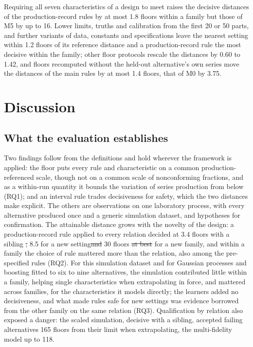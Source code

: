\documentclass[pdflatex,sn-basic,lineno]{sn-jnl}
\providecommand{\DIFadd}[1]{{\protect\color{blue}\uwave{#1}}} %
\providecommand{\DIFdel}[1]{{\protect\color{red}\sout{#1}}}                      %
\providecommand{\DIFaddbegin}{} %
\providecommand{\DIFaddend}{} %
\providecommand{\DIFdelbegin}{} %
\providecommand{\DIFdelend}{} %
\newcommand{\DIFscaledelfig}{0.5}
\newlength{\DIFdelgraphicswidth} %
\newlength{\DIFdelgraphicsheight} %
\newcommand{\DIFaddincludegraphics}[2][]{{\color{blue}\fbox{\DIFOincludegraphics[#1]{#2}}}} %
\newcommand{\DIFdelincludegraphics}[2][]{%
\sbox{\DIFdelgraphicsbox}{\DIFOincludegraphics[#1]{#2}}%
\settoboxwidth{\DIFdelgraphicswidth}{\DIFdelgraphicsbox} %
\settoboxtotalheight{\DIFdelgraphicsheight}{\DIFdelgraphicsbox} %
\scalebox{\DIFscaledelfig}{%
\parbox[b]{\DIFdelgraphicswidth}{\usebox{\DIFdelgraphicsbox}\\[-\baselineskip] \rule{\DIFdelgraphicswidth}{0em}}\llap{\resizebox{\DIFdelgraphicswidth}{\DIFdelgraphicsheight}{%
\setlength{\unitlength}{\DIFdelgraphicswidth}%
\begin{picture}(1,1)%
\thicklines\linethickness{2pt} %
{\color[rgb]{1,0,0}\put(0,0){\framebox(1,1){}}}%
{\color[rgb]{1,0,0}\put(0,0){\line( 1,1){1}}}%
{\color[rgb]{1,0,0}\put(0,1){\line(1,-1){1}}}%
\end{picture}%
}\hspace*{3pt}}} %
} %
\DeclareRobustCommand{\DIFaddbegin}{\DIFOaddbegin \let\includegraphics\DIFaddincludegraphics} %
\DeclareRobustCommand{\DIFaddend}{\DIFOaddend \let\includegraphics\DIFOincludegraphics} %
\DeclareRobustCommand{\DIFdelbegin}{\DIFOdelbegin \let\includegraphics\DIFdelincludegraphics} %
\DeclareRobustCommand{\DIFdelend}{\DIFOaddend \let\includegraphics\DIFOincludegraphics} %
\begin{document}
Requiring all seven characteristics of a design to meet raises the decisive distances of the production-record rules by at most 1.8 floors within a family but those of M5 by up to 16. Lower limits, truths and calibration from the first 20 or 50 parts, and further variants of data, constants and specifications leave the nearest setting within 1.2 floors of its reference distance and a production-record rule the most decisive within the family; other floor protocols rescale the distances by 0.60 to 1.42, and floors recomputed without the held-out alternative's own series move the distances of the main rules by at most 1.4 floors, that of M0 by 3.75.

\section{Discussion}\label{sec:discussion}

\subsection{What the evaluation establishes}

Two findings follow from the definitions and hold wherever the framework is applied: the floor puts every rule and characteristic on a common production-referenced scale, though not on a common scale of nonconforming fractions, and as a within-run quantity it bounds the variation of series production from below (RQ1); and an interval rule trades decisiveness for safety, which the two distances make explicit. The others are observations on one laboratory process, with every alternative produced once and a generic simulation dataset, and hypotheses for confirmation. The attainable distance grows with the novelty of the design: a production-record rule applied to every relation decided at 3.4 floors with a sibling \DIFdelbegin \DIFdel{, }\DIFdelend \DIFaddbegin \DIFadd{and }\DIFaddend 8.5 for a new setting\DIFdelbegin \DIFdel{and }\DIFdelend \DIFaddbegin \DIFadd{, no rule closer than }\DIFaddend 30 floors \DIFdelbegin \DIFdel{at best }\DIFdelend for a new family, and within a family the choice of rule mattered more than the relation, also among the pre-specified rules (RQ2). For this simulation dataset and for Gaussian processes and boosting fitted to six to nine alternatives, the simulation contributed little within a family, helping single characteristics when extrapolating in force, and mattered across families, for the characteristics it models directly; the learners added no decisiveness, and what made rules safe for new settings was evidence borrowed from the other family on the same relation (RQ3). Qualification by relation also exposed a danger: the scaled simulation, decisive with a sibling, accepted failing alternatives 165 floors from their limit when extrapolating, the multi-fidelity model up to 118.
\end{document}
